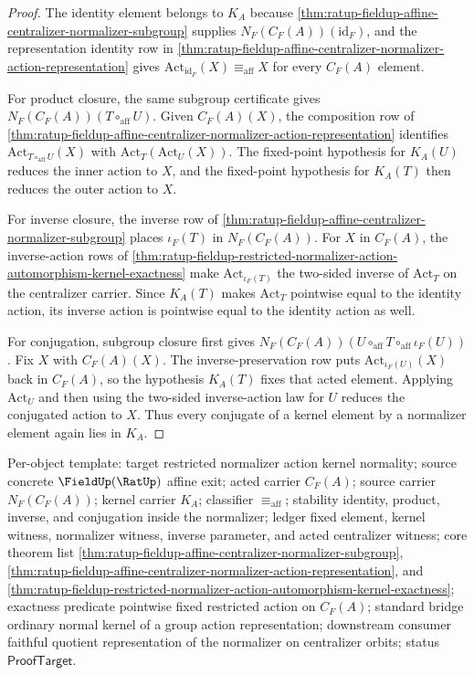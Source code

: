 \begin{proof}
The identity element belongs to $K_A$ because
\autoref{thm:ratup-fieldup-affine-centralizer-normalizer-subgroup} supplies
$N_F(C_F(A))(\mathrm{id}_F)$, and the representation identity row in
\autoref{thm:ratup-fieldup-affine-centralizer-normalizer-action-representation}
gives $\mathrm{Act}_{\mathrm{id}_F}(X)\equiv_{\mathrm{aff}}X$ for every
$C_F(A)$ element.

For product closure, the same subgroup certificate gives
$N_F(C_F(A))(T\circ_{\mathrm{aff}}U)$. Given $C_F(A)(X)$, the composition row
of
\autoref{thm:ratup-fieldup-affine-centralizer-normalizer-action-representation}
identifies $\mathrm{Act}_{T\circ_{\mathrm{aff}}U}(X)$ with
$\mathrm{Act}_T(\mathrm{Act}_U(X))$. The fixed-point hypothesis for $K_A(U)$
reduces the inner action to $X$, and the fixed-point hypothesis for $K_A(T)$
then reduces the outer action to $X$.

For inverse closure, the inverse row of
\autoref{thm:ratup-fieldup-affine-centralizer-normalizer-subgroup} places
$\iota_F(T)$ in $N_F(C_F(A))$. For $X$ in $C_F(A)$, the inverse-action rows of
\autoref{thm:ratup-fieldup-restricted-normalizer-action-automorphism-kernel-exactness}
make $\mathrm{Act}_{\iota_F(T)}$ the two-sided inverse of
$\mathrm{Act}_T$ on the centralizer carrier. Since $K_A(T)$ makes
$\mathrm{Act}_T$ pointwise equal to the identity action, its inverse action is
pointwise equal to the identity action as well.

For conjugation, subgroup closure first gives
$N_F(C_F(A))(U\circ_{\mathrm{aff}}T\circ_{\mathrm{aff}}\iota_F(U))$. Fix
$X$ with $C_F(A)(X)$. The inverse-preservation row puts
$\mathrm{Act}_{\iota_F(U)}(X)$ back in $C_F(A)$, so the hypothesis $K_A(T)$
fixes that acted element. Applying $\mathrm{Act}_U$ and then using the
two-sided inverse-action law for $U$ reduces the conjugated action to $X$.
Thus every conjugate of a kernel element by a normalizer element again lies in
$K_A$.
\end{proof}

Per-object template: target restricted normalizer action kernel normality;
source concrete $\FieldUp(\RatUp)$ affine exit; acted carrier $C_F(A)$; source
carrier $N_F(C_F(A))$; kernel carrier $K_A$; classifier
$\equiv_{\mathrm{aff}}$; stability identity, product, inverse, and conjugation
inside the normalizer; ledger fixed element, kernel witness, normalizer witness,
inverse parameter, and acted centralizer witness; core theorem list
\autoref{thm:ratup-fieldup-affine-centralizer-normalizer-subgroup},
\autoref{thm:ratup-fieldup-affine-centralizer-normalizer-action-representation},
and
\autoref{thm:ratup-fieldup-restricted-normalizer-action-automorphism-kernel-exactness};
exactness predicate pointwise fixed restricted action on $C_F(A)$; standard
bridge ordinary normal kernel of a group action representation; downstream
consumer faithful quotient representation of the normalizer on centralizer
orbits; status $\mathsf{ProofTarget}$.
